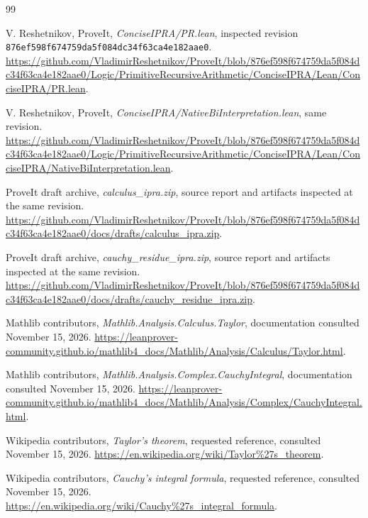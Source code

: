 \documentclass[11pt]{article}
\theoremstyle{definition}
\newcommand{\code}[1]{\texttt{#1}}
\begin{document}
\begin{thebibliography}{99}
\raggedright
{}
V. Reshetnikov, ProveIt, \emph{ConciseIPRA/PR.lean}, inspected revision
\code{876ef598f674759da5f084dc34f63ca4e182aae0}.
\url{https://github.com/VladimirReshetnikov/ProveIt/blob/876ef598f674759da5f084dc34f63ca4e182aae0/Logic/PrimitiveRecursiveArithmetic/ConciseIPRA/Lean/ConciseIPRA/PR.lean}.

V. Reshetnikov, ProveIt, \emph{ConciseIPRA/NativeBiInterpretation.lean},
same revision.
\url{https://github.com/VladimirReshetnikov/ProveIt/blob/876ef598f674759da5f084dc34f63ca4e182aae0/Logic/PrimitiveRecursiveArithmetic/ConciseIPRA/Lean/ConciseIPRA/NativeBiInterpretation.lean}.

ProveIt draft archive, \emph{calculus\_ipra.zip}, source report and
artifacts inspected at the same revision.
\url{https://github.com/VladimirReshetnikov/ProveIt/blob/876ef598f674759da5f084dc34f63ca4e182aae0/docs/drafts/calculus_ipra.zip}.

ProveIt draft archive, \emph{cauchy\_residue\_ipra.zip}, source report and
artifacts inspected at the same revision.
\url{https://github.com/VladimirReshetnikov/ProveIt/blob/876ef598f674759da5f084dc34f63ca4e182aae0/docs/drafts/cauchy_residue_ipra.zip}.

Mathlib contributors, \emph{Mathlib.Analysis.Calculus.Taylor},
documentation consulted November 15, 2026.
\url{https://leanprover-community.github.io/mathlib4_docs/Mathlib/Analysis/Calculus/Taylor.html}.

Mathlib contributors, \emph{Mathlib.Analysis.Complex.CauchyIntegral},
documentation consulted November 15, 2026.
\url{https://leanprover-community.github.io/mathlib4_docs/Mathlib/Analysis/Complex/CauchyIntegral.html}.

Wikipedia contributors, \emph{Taylor's theorem}, requested reference,
consulted November 15, 2026.
\url{https://en.wikipedia.org/wiki/Taylor%27s_theorem}.

Wikipedia contributors, \emph{Cauchy's integral formula}, requested
reference, consulted November 15, 2026.
\url{https://en.wikipedia.org/wiki/Cauchy%27s_integral_formula}.
\end{thebibliography}
\end{document}
